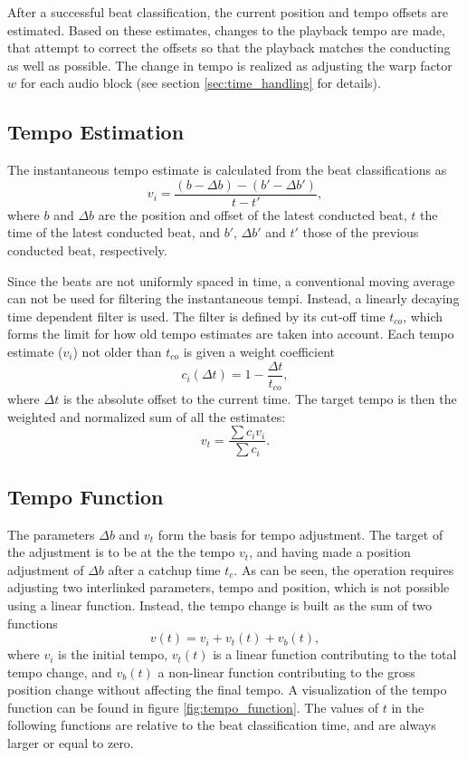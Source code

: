 After a successful beat classification,
the current position and tempo offsets
are estimated.
Based on these estimates,
changes to the playback tempo are made,
that attempt to correct the offsets
so that the playback matches the conducting
as well as possible.
The change in tempo is realized as adjusting
the warp factor $w$ for each audio block
(see section \ref{sec:time_handling} for details).

\subsection{Tempo Estimation}

The instantaneous tempo estimate is calculated from
the beat classifications as
\begin{equation}
v_i = \frac{(b - \Delta b) - (b' - \Delta b')}{t - t'},
\end{equation}
where $b$ and $\Delta b$ are the position and offset of
the latest conducted beat,
$t$ the time of the latest conducted beat,
and $b'$, $\Delta b'$ and $t'$ those of
the previous conducted beat, respectively.

Since the beats are not uniformly spaced in time,
a conventional moving average can not be used
for filtering the instantaneous tempi.
Instead, a linearly decaying time dependent filter is used.
The filter is defined by its cut-off time $t_{co}$,
which forms the limit for how old tempo estimates
are taken into account.
Each tempo estimate ($v_i$) not older than $t_{co}$ is given a weight coefficient
\begin{equation}
c_i(\Delta t) = 1 - \frac{\Delta t}{t_{co}},
\end{equation}
where $\Delta t$ is the absolute offset to the current time.
The target tempo is then the
weighted and normalized sum of all the estimates:
\begin{equation}
v_t = \frac{\sum c_i v_i}{\sum c_i}.
\end{equation}


\subsection{Tempo Function}
\label{sec:tempo_function}

The parameters $\Delta b$ and $v_t$
form the basis for tempo adjustment.
The target of the adjustment is to be
at the the tempo $v_t$,
and having made a position adjustment of $\Delta b$
after a catchup time $t_c$.
As can be seen,
the operation requires adjusting two interlinked parameters,
tempo and position,
which is not possible using a linear function.
Instead, the tempo change is built as the sum of two functions
\begin{equation}
v(t) = v_i + v_t(t) + v_b(t),
\end{equation}
where $v_i$ is the initial tempo,
$v_t(t)$ is a linear function
contributing to the total tempo change,
and $v_b(t)$ a non-linear function contributing
to the gross position change
without affecting the final tempo.
A visualization of the tempo function can be found
in figure \ref{fig:tempo_function}.
The values of $t$ in the following functions are relative to the
beat classification time,
and are always larger or equal to zero.

